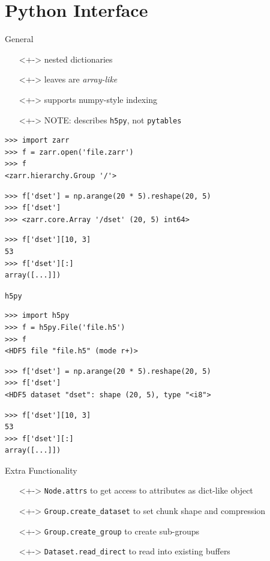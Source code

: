 \documentclass{beamer}
\begin{document}
\section{Python Interface}

\begin{frame}{General}
  \begin{itemize}
  \item[]<+-> nested dictionaries
  \item[]<+-> leaves are \textit{array-like}
  \item[]<+-> supports numpy-style indexing
  \item[]<+-> NOTE: describes \texttt{h5py}, not \texttt{pytables}
  \end{itemize}
\end{frame}

\begin{frame}[fragile]{\zarr}
  \begin{verbatim}
>>> import zarr
>>> f = zarr.open('file.zarr')
>>> f
<zarr.hierarchy.Group '/'>
  \end{verbatim}
  \pause

  \begin{verbatim}
>>> f['dset'] = np.arange(20 * 5).reshape(20, 5)
>>> f['dset']
>>> <zarr.core.Array '/dset' (20, 5) int64>
\end{verbatim}
  \pause

  \begin{verbatim}
>>> f['dset'][10, 3]
53
>>> f['dset'][:]
array([...]])
  \end{verbatim}
\end{frame}

\begin{frame}[fragile]{\texttt{h5py}}
  \begin{verbatim}
>>> import h5py
>>> f = h5py.File('file.h5')
>>> f
<HDF5 file "file.h5" (mode r+)>
  \end{verbatim}
  \pause

  \begin{verbatim}
>>> f['dset'] = np.arange(20 * 5).reshape(20, 5)
>>> f['dset']
<HDF5 dataset "dset": shape (20, 5), type "<i8">
\end{verbatim}
  \pause

  \begin{verbatim}
>>> f['dset'][10, 3]
53
>>> f['dset'][:]
array([...]])
  \end{verbatim}
\end{frame}

\begin{frame}{Extra Functionality}
  \begin{itemize}
  \item[]<+-> \texttt{Node.attrs} to get access to attributes as dict-like object
  \item[]<+-> \texttt{Group.create\_dataset} to set chunk shape and compression
  \item[]<+-> \texttt{Group.create\_group} to create sub-groups
  \item[]<+-> \texttt{Dataset.read\_direct} to read into existing buffers
  \end{itemize}
\end{frame}
\end{document}
